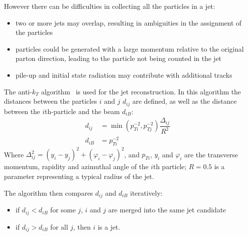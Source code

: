 However there can be difficulties in collecting all the particles in a jet:
\begin{itemize}
    \item two or more jets may overlap, resulting in ambiguities in the assignment of the particles
    \item particles could be generated with a large momentum relative to the
        original parton direction, leading to the particle not being counted
        in the jet
    \item pile-up and initial state radiation may contribute with additional
        tracks 
\end{itemize}
The anti-$k_T$ algorithm~\cite{antikt} is used for the jet reconstruction. In this
algorithm the distances between the particles $i$ and $j$ $d_{ij}$ are defined, as well
as the distance between the $i$th-particle and the beam $d_{iB}$:
\begin{align*}
    d_{ij} &= \min(p_{Ti}^{-2}, p_{Tj}^{-2})\dfrac{\Delta_{ij}}{R^2}\\
    d_{iB} &= p_{Ti}^{-2}
\end{align*}
Where $\Delta_{ij}^2 = (y_i - y_j)^2 + (\varphi_i - \varphi_j)^2$, and
$p_{Ti}$, $y_i$ and $\varphi_i$ are the transverse momentum, rapidity and
azimuthal angle of the $i$th particle; $R = 0.5$ is a parameter representing a
typical radius of the jet.

The algorithm then compares $d_{ij}$ and $d_{iB}$ iteratively:
\begin{itemize}
    \item if $d_{ij} < d_{iB}$ for some $j$, $i$ and $j$ are merged into the
        same jet candidate
    \item if $d_{ij} > d_{iB}$ for all $j$, then $i$ is a jet.
\end{itemize}

